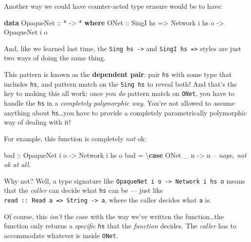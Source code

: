 \documentclass[]{article}
\newenvironment{Shaded}{}{}
\newcommand{\KeywordTok}[1]{\textcolor[rgb]{0.00,0.44,0.13}{\textbf{{#1}}}}
\newcommand{\DataTypeTok}[1]{\textcolor[rgb]{0.56,0.13,0.00}{{#1}}}
\newcommand{\CommentTok}[1]{\textcolor[rgb]{0.38,0.63,0.69}{\textit{{#1}}}}
\newcommand{\OtherTok}[1]{\textcolor[rgb]{0.00,0.44,0.13}{{#1}}}
\newcommand{\FunctionTok}[1]{\textcolor[rgb]{0.02,0.16,0.49}{{#1}}}
\newcommand{\NormalTok}[1]{{#1}}
\begin{document}
Another way we could have counter-acted type erasure would be to have:

\begin{Shaded}
\begin{Highlighting}[]
\KeywordTok{data} \DataTypeTok{OpaqueNet}\OtherTok{ ::} \FunctionTok{*} \OtherTok{->} \FunctionTok{*} \KeywordTok{where}
    \DataTypeTok{ONet}\OtherTok{ ::} \DataTypeTok{SingI} \NormalTok{hs }\OtherTok{=>} \DataTypeTok{Network} \NormalTok{i hs o }\OtherTok{->} \DataTypeTok{OpaqueNet} \NormalTok{i o}
\end{Highlighting}
\end{Shaded}

And, like we learned last time, the \texttt{Sing\ hs\ -\textgreater{}} and
\texttt{SingI\ hs\ =\textgreater{}} styles are just two ways of doing the same
thing.

This pattern is known as the \textbf{dependent pair}: pair \texttt{hs} with some
type that includes \texttt{hs}, and pattern match on the \texttt{Sing\ hs} to
reveal both! And that's the key to making this all work: once you \emph{do}
pattern match on \texttt{ONet}, you have to handle the \texttt{hs} in a
\emph{completely polymorphic way}. You're not allowed to assume anything about
\texttt{hs}\ldots{}you have to provide a completely parametrically polymorphic
way of dealing with it!

For example, this function is completely \emph{not} ok:

\begin{Shaded}
\begin{Highlighting}[]
\OtherTok{bad ::} \DataTypeTok{OpaqueNet} \NormalTok{i o }\OtherTok{->} \DataTypeTok{Network} \NormalTok{i hs o}
\NormalTok{bad }\FunctionTok{=} \NormalTok{\textbackslash{}}\KeywordTok{case} \DataTypeTok{ONet} \NormalTok{_ n }\OtherTok{->} \NormalTok{n          }\CommentTok{-- nope, not ok at all.}
\end{Highlighting}
\end{Shaded}

Why not? Well, a type signature like
\texttt{OpaqueNet\ i\ o\ -\textgreater{}\ Network\ i\ hs\ o} means that the
\emph{caller} can decide what \texttt{hs} can be --- just like
\texttt{read\ ::\ Read\ a\ =\textgreater{}\ String\ -\textgreater{}\ a}, where
the caller decides what \texttt{a} is.

Of course, this \emph{isn't} the case with the way we've written the
function\ldots{}the function only returns a \emph{specific} \texttt{hs} that the
\emph{function} decides. The \emph{caller} has to accommodate whatever is inside
\texttt{ONet}.
\end{document}
